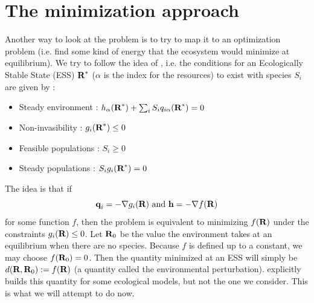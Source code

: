 \documentclass[12pt, titlepage]{report}
\begin{document}
				\section{The minimization approach}
				Another way to look at the problem is to try to map it to an optimization problem (i.e. find some kind of energy that the ecosystem would minimize at equilibrium). We try to follow the idea of \cite{PankajNiche}, i.e. the conditions for an Ecologically Stable State (ESS) $\textbf{R}^*$ ($\alpha$ is the index for the resources) to exist with species $S_i$ are given by :
				\begin{itemize}
					\item Steady environment : $h_\alpha(\textbf{R}^*) + \sum_i S_i q_{i\alpha}(\textbf{R}^*) = 0$
					\item Non-invasibility : $g_i(\textbf{R}^*) \leq 0$
					\item Feasible populations : $S_i \geq 0$
					\item Steady populations : $S_i g_i(\textbf{R}^*)=0$
				\end{itemize}
		The idea is that if
		\begin{equation}
			\textbf{q}_i = - \nabla g_i(\textbf{R}) \text{ and } \textbf{h} = - \nabla f(\textbf{R})
		\end{equation}
		for some function $f$, then the problem is equivalent to minimizing $f(\textbf{R})$ under the constraints $g_i(\textbf{R}) \leq 0$. Let $\textbf{R}_0$ be the value the environment takes at an equilibrium when there are no species. Because $f$ is defined up to a constant, we may choose $f(\textbf{R}_0)  = 0 $. Then the quantity minimized at an ESS will simply be $d(\textbf{R}, \textbf{R}_0) := f(\textbf{R})$ (a quantity called the environmental perturbation). \cite{PankajNiche} explicitly builds this quantity for some ecological models, but not the one we consider. This is what we will attempt to do now.
\end{document}

